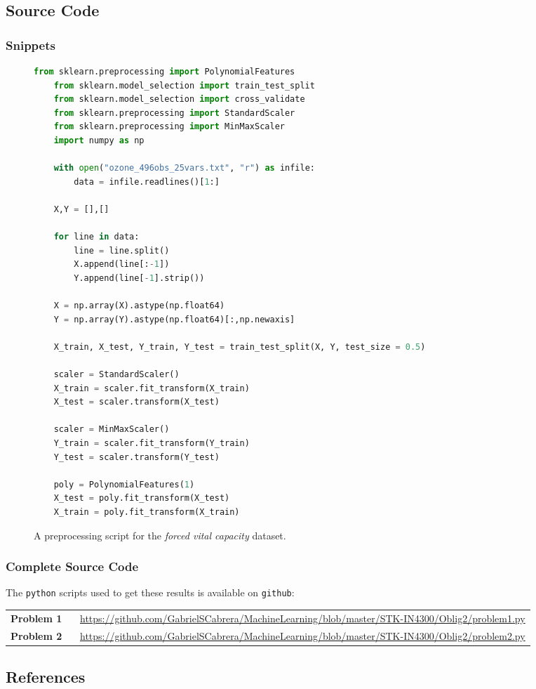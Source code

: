 \documentclass[twoside,twocolumn,10pt]{revtex4-1}
\begin{document}
	\subsection{Source Code}
	
	\subsubsection{Snippets}
	
	\begin{figure}[H]
	\begin{lstlisting}[showstringspaces=false,language=Python,numbers=none]
	from sklearn.preprocessing import PolynomialFeatures
	from sklearn.model_selection import train_test_split
	from sklearn.model_selection import cross_validate
	from sklearn.preprocessing import StandardScaler
	from sklearn.preprocessing import MinMaxScaler
	import numpy as np
	
	with open("ozone_496obs_25vars.txt", "r") as infile:
	    data = infile.readlines()[1:]
	
	X,Y = [],[]
	
	for line in data:
	    line = line.split()
	    X.append(line[:-1])
	    Y.append(line[-1].strip())
	
	X = np.array(X).astype(np.float64)
	Y = np.array(Y).astype(np.float64)[:,np.newaxis]
	
	X_train, X_test, Y_train, Y_test = train_test_split(X, Y, test_size = 0.5)
	
	scaler = StandardScaler()
	X_train = scaler.fit_transform(X_train)
	X_test = scaler.transform(X_test)
	
	scaler = MinMaxScaler()
	Y_train = scaler.fit_transform(Y_train)
	Y_test = scaler.transform(Y_test)
	
	poly = PolynomialFeatures(1)
	X_test = poly.fit_transform(X_test)
	X_train = poly.fit_transform(X_train)
	\end{lstlisting}
	\caption{A preprocessing script for the \textit{forced vital capacity} dataset.\label{code_0}}
	\end{figure}
	
	\onecolumngrid	
	
	\subsubsection{Complete Source Code}
	
	The \texttt{python} scripts used to get these results is available on \texttt{github}:
	
	\begin{table}[H]
	\center
	\begin{tabular}{l c}
	\textbf{Problem 1} \ & \url{https://github.com/GabrielSCabrera/MachineLearning/blob/master/STK-IN4300/Oblig2/problem1.py} \\
	\textbf{Problem 2} \ & \url{https://github.com/GabrielSCabrera/MachineLearning/blob/master/STK-IN4300/Oblig2/problem2.py} 
	\end{tabular}
	\end{table}
	
	\subsection*{References}
	
	
	
	


	
\end{document}
